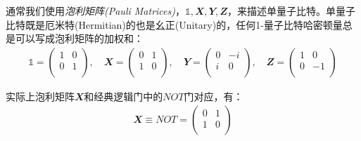 通常我们使用\emph{泡利矩阵(Pauli Matrices)}，$\mathbb{1}, \mathbfit{X}, \mathbfit{Y}, \mathbfit{Z}$，来描述单量子比特。单量子比特既是厄米特(Hermitian)的也是幺正(Unitary)的，任何1-量子比特哈密顿量总是可以写成泡利矩阵的加权和：
\begin{align}
    \mathbb{1}=\begin{pmatrix}
        1 & 0 \\
        0 & 1 \\
    \end{pmatrix}, \quad \mathbfit{X}=\begin{pmatrix}
        0 & 1 \\
        1 & 0 \\
    \end{pmatrix}, \quad  \mathbfit{Y}=\begin{pmatrix}
        0 & -i \\
        i & 0 \\
    \end{pmatrix}, \quad  \mathbfit{Z}=\begin{pmatrix}
        1 & 0 \\
        0 & -1 \\
    \end{pmatrix} \label{eq:pauli_matrices}
\end{align}

实际上泡利矩阵$\mathbfit{X}$和经典逻辑门中的$NOT$门对应，有：
\begin{align}
    \mathbfit{X}\equiv NOT = \begin{pmatrix}
        0 & 1 \\
        1 & 0 \\
    \end{pmatrix}
\end{align}

